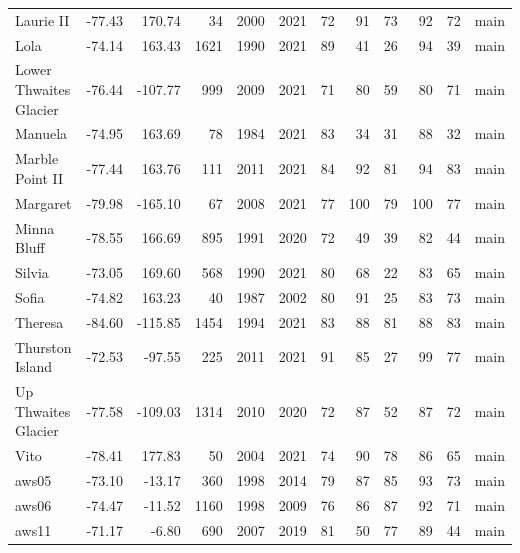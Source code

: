\begin{table}[p]
{\begin{tabular}{lrrrrrrrrrrl}
    Laurie II & -77.43 & 170.74 & 34 & 2000 & 2021 & 72 & 91 & 73 & 92 & 72 & main \\
    Lola & -74.14 & 163.43 & 1621 & 1990 & 2021 & 89 & 41 & 26 & 94 & 39 & main \\
    Lower Thwaites Glacier & -76.44 & -107.77 & 999 & 2009 & 2021 & 71 & 80 & 59 & 80 & 71 & main \\
    Manuela & -74.95 & 163.69 & 78 & 1984 & 2021 & 83 & 34 & 31 & 88 & 32 & main \\
    Marble Point II & -77.44 & 163.76 & 111 & 2011 & 2021 & 84 & 92 & 81 & 94 & 83 & main \\
    Margaret & -79.98 & -165.10 & 67 & 2008 & 2021 & 77 & 100 & 79 & 100 & 77 & main \\
    Minna Bluff & -78.55 & 166.69 & 895 & 1991 & 2020 & 72 & 49 & 39 & 82 & 44 & main \\
    Silvia & -73.05 & 169.60 & 568 & 1990 & 2021 & 80 & 68 & 22 & 83 & 65 & main \\
    Sofia & -74.82 & 163.23 & 40 & 1987 & 2002 & 80 & 91 & 25 & 83 & 73 & main \\
    Theresa & -84.60 & -115.85 & 1454 & 1994 & 2021 & 83 & 88 & 81 & 88 & 83 & main \\
    Thurston Island & -72.53 & -97.55 & 225 & 2011 & 2021 & 91 & 85 & 27 & 99 & 77 & main \\
    Up Thwaites Glacier & -77.58 & -109.03 & 1314 & 2010 & 2020 & 72 & 87 & 52 & 87 & 72 & main \\
    Vito & -78.41 & 177.83 & 50 & 2004 & 2021 & 74 & 90 & 78 & 86 & 65 & main \\
    aws05 & -73.10 & -13.17 & 360 & 1998 & 2014 & 79 & 87 & 85 & 93 & 73 & main \\
    aws06 & -74.47 & -11.52 & 1160 & 1998 & 2009 & 76 & 86 & 87 & 92 & 71 & main \\
    aws11 & -71.17 & -6.80 & 690 & 2007 & 2019 & 81 & 50 & 77 & 89 & 44 & main \\
    \bottomrule
  \end{tabular}}
\end{table}
